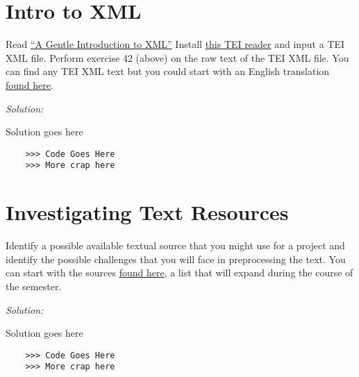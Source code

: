 \documentclass[11pt]{article}
\newenvironment{solution}{
	\vspace{10px}\noindent\emph{Solution:}
}{
	\vspace{10px}
}
\begin{document}
\newpage
\section*{Intro to XML} Read \href{http://www.tei-c.org/release/doc/tei-p5-doc/en/html/SG.html}{“A Gentle Introduction to XML”} 
Install \href{https://github.com/UUDigitalHumanitieslab/tei_reader}{this TEI reader} and input a TEI XML file.
Perform exercise 42 (above) on the raw text of the TEI XML file. You can find any TEI XML text but you could start with an English translation \href{https://github.com/OpenGreekAndLatin/english_trans-dev/tree/master/volumes}{found here}. 


\begin{solution}
	
	Solution goes here
	
	\begin{lstlisting}
	>>> Code Goes Here
	>>> More crap here
	\end{lstlisting}
	
\end{solution} 



\section*{Investigating Text Resources} Identify a possible available textual source that you might use for a project and identify the possible challenges that you will face in preprocessing the text. You can start with the sources \href{https://docs.google.com/document/d/1Hh93ixO_204mtS0Vva-X52bt1ZJMajLHxrcmfWF5JHg/edit}{found here}, a list that will expand during the course of the semester.

\begin{solution}
	
	Solution goes here
	
	\begin{lstlisting}
	>>> Code Goes Here
	>>> More crap here
	\end{lstlisting}
	
\end{solution} 
\end{document}
